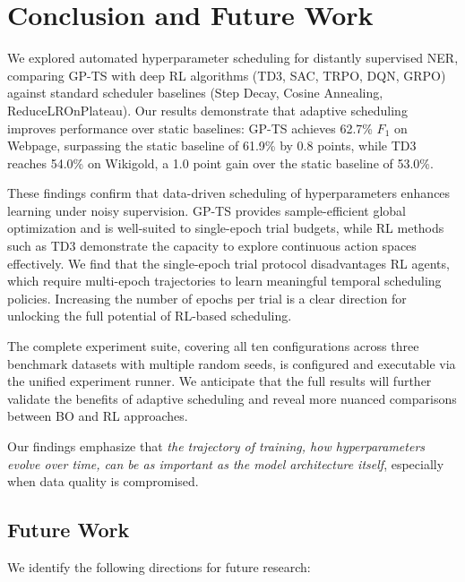 \documentclass[11pt]{article}
\begin{document}
\section{Conclusion and Future Work}

We explored automated hyperparameter scheduling for distantly supervised NER, comparing GP-TS with deep RL algorithms (TD3, SAC, TRPO, DQN, GRPO) against standard scheduler baselines (Step Decay, Cosine Annealing, ReduceLROnPlateau). Our results demonstrate that adaptive scheduling improves performance over static baselines: GP-TS achieves 62.7\% $F_1$ on Webpage, surpassing the static baseline of 61.9\% by 0.8 points, while TD3 reaches 54.0\% on Wikigold, a 1.0 point gain over the static baseline of 53.0\%.

These findings confirm that data-driven scheduling of hyperparameters enhances learning under noisy supervision. GP-TS provides sample-efficient global optimization and is well-suited to single-epoch trial budgets, while RL methods such as TD3 demonstrate the capacity to explore continuous action spaces effectively. We find that the single-epoch trial protocol disadvantages RL agents, which require multi-epoch trajectories to learn meaningful temporal scheduling policies. Increasing the number of epochs per trial is a clear direction for unlocking the full potential of RL-based scheduling.

The complete experiment suite, covering all ten configurations across three benchmark datasets with multiple random seeds, is configured and executable via the unified experiment runner. We anticipate that the full results will further validate the benefits of adaptive scheduling and reveal more nuanced comparisons between BO and RL approaches.

Our findings emphasize that \textit{the trajectory of training, how hyperparameters evolve over time, can be as important as the model architecture itself}, especially when data quality is compromised.

\subsection*{Future Work}
We identify the following directions for future research:
\end{document}
